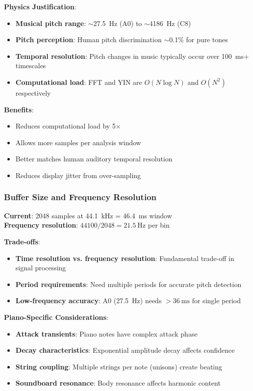 \documentclass[11pt,a4paper]{article}
\begin{document}
\textbf{Physics Justification}:
\begin{itemize}
    \item \textbf{Musical pitch range}: $\sim$\SI{27.5}{\hertz} (A0) to $\sim$\SI{4186}{\hertz} (C8)
    \item \textbf{Pitch perception}: Human pitch discrimination $\sim$0.1\% for pure tones
    \item \textbf{Temporal resolution}: Pitch changes in music typically occur over \SI{100}{\milli\second}+ timescales
    \item \textbf{Computational load}: FFT and YIN are $O(N \log N)$ and $O(N^2)$ respectively
\end{itemize}

\textbf{Benefits}:
\begin{itemize}
    \item Reduces computational load by 5×
    \item Allows more samples per analysis window
    \item Better matches human auditory temporal resolution
    \item Reduces display jitter from over-sampling
\end{itemize}

\subsubsection{Buffer Size and Frequency Resolution}

\textbf{Current}: 2048 samples at \SI{44.1}{\kilo\hertz} = \SI{46.4}{\milli\second} window \\
\textbf{Frequency resolution}: $44100/2048 = \SI{21.5}{\hertz}$ per bin

\textbf{Trade-offs}:
\begin{itemize}
    \item \textbf{Time resolution vs. frequency resolution}: Fundamental trade-off in signal processing
    \item \textbf{Period requirements}: Need multiple periods for accurate pitch detection
    \item \textbf{Low-frequency accuracy}: A0 (\SI{27.5}{\hertz}) needs $>\SI{36}{\milli\second}$ for single period
\end{itemize}

\textbf{Piano-Specific Considerations}:
\begin{itemize}
    \item \textbf{Attack transients}: Piano notes have complex attack phase
    \item \textbf{Decay characteristics}: Exponential amplitude decay affects confidence
    \item \textbf{String coupling}: Multiple strings per note (unisons) create beating
    \item \textbf{Soundboard resonance}: Body resonance affects harmonic content
\end{itemize}
\end{document}
